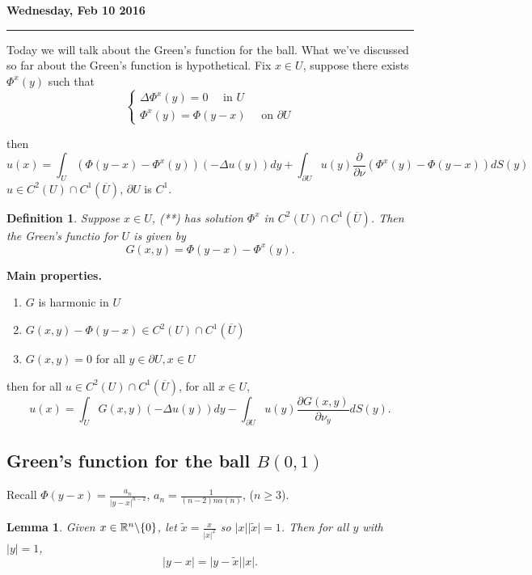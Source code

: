 \documentclass[11pt]{amsart}%
\newtheorem{lemma}[theorem]{Lemma}
\newtheorem{definition}[theorem]{Definition}
\begin{document}
\textbf{Wednesday, Feb 10 2016}

\begin{center}\rule{0.5\linewidth}{\linethickness}\end{center}
Today we will talk about the Green's function for the ball. What we've discussed so far about the Green's function is hypothetical. Fix $x\in U$, suppose there exists $\Phi^x(y)$ such that
\[\begin{cases} \Delta \Phi^x(y) =0 \quad \text{ in $U$}\\
                \Phi^x(y)=\Phi(y-x) \quad \text{ on $\partial U$}
                \end{cases} \tag{**}\]

then
$$u(x)=\int_U (\Phi(y-x)-\Phi^x(y))(-\Delta u(y))dy + \int_{\partial U} u(y)\frac{\partial}{\partial \nu}(\Phi^x(y) - \Phi(y-x)) dS(y)$$
$u\in C^2(U)\cap C^1(\overline{U})$, $\partial U$ is $C^1$.

\begin{definition}
    Suppose $x\in U$, (**) has solution $\Phi^x$ in $C^2(U)\cap C^1(\overline{U})$. Then the Green's functio for $U$ is given by
    $$G(x,y)=\Phi(y-x) - \Phi^x(y).$$
\end{definition}

{\bf Main properties.}
\begin{enumerate}
    \item $G$ is harmonic in $U$
    \item $G(x,y) - \Phi(y-x) \in C^2(U)\cap C^1(\overline{U})$
    \item $G(x,y)=0$ for all $y\in \partial U, x\in U$
\end{enumerate}
then for all $u\in C^2(U)\cap C^1(\overline{U})$, for all $x\in U$,
$$u(x)= \int_U G(x,y)(-\Delta u(y))dy -\int_{\partial U} u(y)\frac{\partial G(x,y)}{\partial \nu_y} dS(y).$$

\subsection{Green's function for the ball $B(0,1)$}

Recall $\Phi(y-x)=\frac{a_n}{\vert y-x\vert^{n-2}}$, $a_n =\frac{1}{(n-2)n\alpha(n)}$, ($n\ge 3$).

\begin{lemma}
    Given $x\in \mathbb{R}^n\backslash\{0\}$, let $\tilde{x}=\frac{x}{\vert x\vert^2}$ so $\vert x\vert \vert \tilde x\vert =1$. Then for all $y$ with $\vert y\vert =1$, $$\vert y-x \vert =\vert y-\tilde{x}\vert\vert x\vert.$$
\end{lemma}
\end{document}
